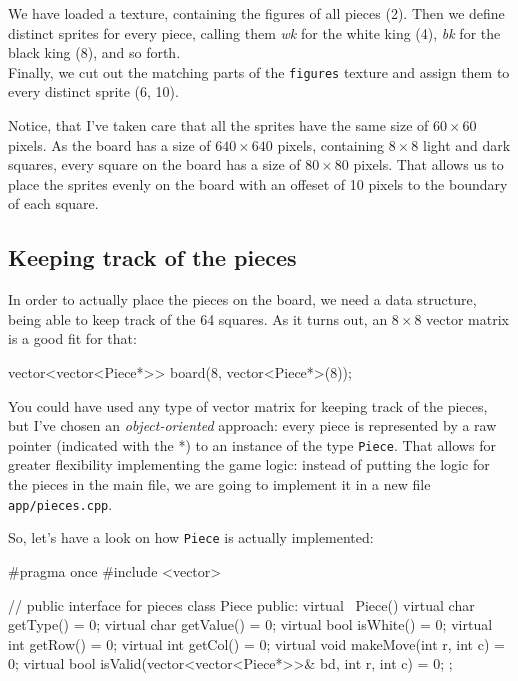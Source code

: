 We have loaded a texture, containing the figures of all pieces (2).
Then we define distinct sprites for every piece, calling them \emph{wk} for the white king (4),
\emph{bk} for the black king (8), and so forth.\\
Finally, we cut out the matching parts of the \texttt{figures} texture and assign
them to every distinct sprite (6, 10).


Notice, that I've taken care that all the sprites have the same size of
$60 \times 60$ pixels.
As the board has a size of $640 \times 640$ pixels, containing $8 \times 8$ light and dark squares,
every square on the board has a size of $80 \times 80$ pixels.
That allows us to place the sprites evenly on the board with an offeset of 10 pixels to the
boundary of each square.

\subsection{Keeping track of the pieces}
In order to actually place the pieces on the board, we need a data structure, being able to
keep track of the 64 squares.
As it turns out, an $8 \times 8$ vector matrix is a good fit for that:

\begin{cpp}
vector<vector<Piece*>> board(8, vector<Piece*>(8));
\end{cpp}

You could have used any type of vector matrix for keeping track of the pieces,
but I've chosen an \emph{object-oriented} approach:
every piece is represented by a raw pointer (indicated with the *) to an instance of the type
\texttt{Piece}.
That allows for greater flexibility implementing the game logic: instead of putting
the logic for the pieces in the main file, we are going to implement it in a new file
\texttt{app/pieces.cpp}.

So, let's have a look on how \texttt{Piece} is actually implemented:

\begin{cpp}
#pragma once
#include <vector>

// public interface for pieces
class Piece {
public:
  virtual ~Piece() {}
  virtual char getType() = 0;
  virtual char getValue() = 0;
  virtual bool isWhite() = 0;
  virtual int getRow() = 0;
  virtual int getCol() = 0;
  virtual void makeMove(int r, int c) = 0;
  virtual bool isValid(vector<vector<Piece*>>& bd, int r, int c) = 0;
};
\end{cpp}

